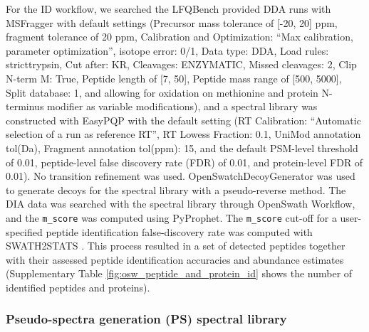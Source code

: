 \documentclass[10pt,letterpaper]{article}
\begin{document}
For the ID workflow, we searched the LFQBench provided DDA runs with MSFragger\cite{kong2017msfragger} with default settings (Precursor mass tolerance of [-20, 20] ppm, fragment tolerance of 20 ppm, Calibration and Optimization: ``Max calibration, parameter optimization'', isotope error: 0/1, Data type: DDA, Load rules: stricttrypsin, Cut after: KR, Cleavages: ENZYMATIC, Missed cleavages: 2, Clip N-term M: True, Peptide length of [7, 50], Peptide mass range of [500, 5000], Split database: 1, and allowing for oxidation on methionine and protein N-terminus modifier as variable modifications), and a spectral library was constructed with EasyPQP \cite{easypqp} with the default setting (RT Calibration: ``Automatic selection of a run as reference RT'', RT Lowess Fraction: 0.1, UniMod annotation tol(Da), Fragment annotation tol(ppm): 15, and the default PSM-level threshold of 0.01, peptide-level false discovery rate (FDR) of 0.01, and protein-level FDR of 0.01). No transition refinement was used. OpenSwatchDecoyGenerator was used to generate decoys for the spectral library with a pseudo-reverse method. The DIA data was searched with the spectral library through OpenSwath Workflow, and the \texttt{m\_score} was computed using PyProphet\cite{teleman2015diana}. The \texttt{m\_score} cut-off for a user-specified peptide identification false-discovery rate was computed with SWATH2STATS \cite{blattmann2016swath2stats}. This process resulted in a set of detected peptides together with their assessed peptide identification accuracies and abundance estimates (Supplementary Table \ref{fig:osw_peptide_and_protein_id} shows the number of identified peptides and proteins).


\subsubsection*{Pseudo-spectra generation (PS) spectral library}
\end{document}
